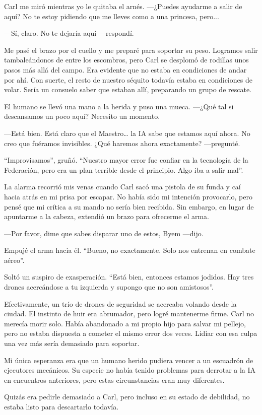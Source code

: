 Carl me miró mientras yo le quitaba el arnés. —¿Puedes ayudarme a salir de aquí? No te estoy pidiendo que me lleves como a una princesa, pero...

—Sí, claro. No te dejaría aquí —respondí.

Me pasé el brazo por el cuello y me preparé para soportar su peso. Logramos salir tambaleándonos de entre los escombros, pero Carl se desplomó de rodillas unos pasos más allá del campo. Era evidente que no estaba en condiciones de andar por ahí. Con suerte, el resto de nuestro séquito todavía estaba en condiciones de volar. Sería un consuelo saber que estaban allí, preparando un grupo de rescate.

El humano se llevó una mano a la herida y puso una mueca. —¿Qué tal si descansamos un poco aquí? Necesito un momento.

—Está bien. Está claro que el Maestro… la IA sabe que estamos aquí ahora. No creo que fuéramos invisibles. ¿Qué haremos ahora exactamente? —pregunté.

“Improvisamos”, gruñó. “Nuestro mayor error fue confiar en la tecnología de la Federación, pero era un plan terrible desde el principio. Algo iba a salir mal”.

La alarma recorrió mis venas cuando Carl sacó una pistola de su funda y caí hacia atrás en mi prisa por escapar. No había sido mi intención provocarlo, pero pensé que mi crítica a su mando no sería bien recibida. Sin embargo, en lugar de apuntarme a la cabeza, extendió un brazo para ofrecerme el arma.

—Por favor, dime que sabes disparar uno de estos, Byem —dijo.

Empujé el arma hacia él. “Bueno, no exactamente. Solo nos entrenan en combate aéreo”.

Soltó un suspiro de exasperación. “Está bien, entonces estamos jodidos. Hay tres drones acercándose a tu izquierda y supongo que no son amistosos”.

Efectivamente, un trío de drones de seguridad se acercaba volando desde la ciudad. El instinto de huir era abrumador, pero logré mantenerme firme. Carl no merecía morir solo. Había abandonado a mi propio hijo para salvar mi pellejo, pero no estaba dispuesta a cometer el mismo error dos veces. Lidiar con esa culpa una vez más sería demasiado para soportar.

Mi única esperanza era que un humano herido pudiera vencer a un escuadrón de ejecutores mecánicos. Su especie no había tenido problemas para derrotar a la IA en encuentros anteriores, pero estas circunstancias eran muy diferentes.

Quizás era pedirle demasiado a Carl, pero incluso en su estado de debilidad, no estaba listo para descartarlo todavía.